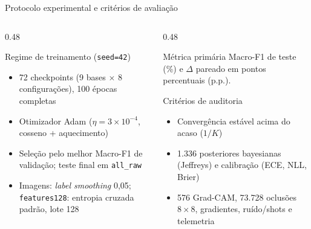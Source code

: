 \documentclass[aspectratio=169,11pt,brazil]{beamer}
\begin{document}
\begin{frame}{Protocolo experimental e critérios de avaliação}
  \begin{columns}[T,onlytextwidth]
    \begin{column}{0.48\textwidth}
      \begin{block}{Regime de treinamento (\texttt{seed=42})}
        \begin{itemize}\setlength{\itemsep}{4pt}
          \item 72 checkpoints (9 bases $\times$ 8 configurações), 100 épocas completas
          \item Otimizador Adam ($\eta = 3\times 10^{-4}$, cosseno + aquecimento)
          \item Seleção pelo melhor Macro-F1 de validação; teste final em \texttt{all\_raw}
          \item Imagens: \textit{label smoothing} 0,05; \texttt{features128}: entropia cruzada padrão, lote 128
        \end{itemize}
      \end{block}
    \end{column}
    \begin{column}{0.48\textwidth}
      \begin{block}{Métrica primária}
        Macro-F1 de teste (\%) e $\Delta$ pareado em pontos percentuais (p.p.).
      \end{block}
      \vspace{0.12cm}
      \begin{block}{Critérios de auditoria}
        \begin{itemize}\setlength{\itemsep}{3pt}
          \item Convergência estável acima do acaso ($1/K$)
          \item 1.336 posteriores bayesianas (Jeffreys) e calibração (ECE, NLL, Brier)
          \item 576 Grad-CAM, 73.728 oclusões $8\times 8$, gradientes, ruído/shots e telemetria
        \end{itemize}
      \end{block}
    \end{column}
  \end{columns}
\end{frame}
\end{document}
